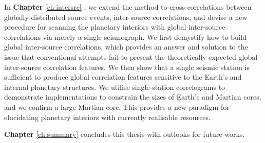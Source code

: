 In \textbf{Chapter} \ref{ch:intersrc} \citep{wang2022inter-src}, we extend the method to cross-correlations between globally distributed source events, inter-source correlations, and devise a new procedure for scanning the planetary interiors with global inter-source correlations via merely a single seismograph. We first demystify how to build global inter-source correlations, which provides an answer and solution to the issue that conventional attempts fail to present the theoretically expected global inter-source correlation features. We then show that a single seismic station is sufficient to produce global correlation features sensitive to the Earth's and internal planetary structures. We utilise single-station correlograms to demonstrate implementations to constrain the sizes of Earth's and Martian cores, and we confirm a large Martian core. This provides a new paradigm for elucidating planetary interiors with currently realisable resources.

\textbf{Chapter} \ref{ch:summary} concludes this thesis with outlooks for future works.


